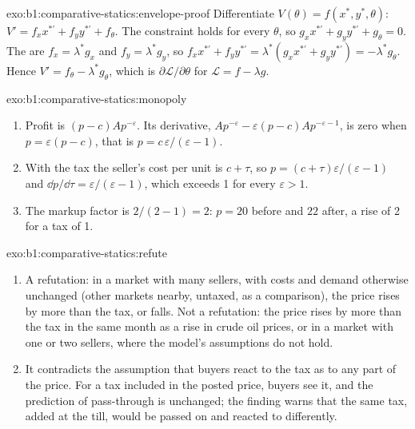 \begin{solution}{exo:b1:comparative-statics:envelope-proof}
Differentiate $V(\theta) = f(x^*, y^*, \theta)$:
$V' = f_x x^{*\prime} + f_y y^{*\prime} + f_\theta$. The constraint holds for
every $\theta$, so $g_x x^{*\prime} + g_y y^{*\prime} + g_\theta = 0$. The  are $f_x = \lambda^* g_x$ and $f_y = \lambda^* g_y$, so
$f_x x^{*\prime} + f_y y^{*\prime} = \lambda^*(g_x x^{*\prime} + g_y y^{*\prime})
= -\lambda^* g_\theta$. Hence $V' = f_\theta - \lambda^* g_\theta$, which is
$\partial\mathcal L/\partial\theta$ for $\mathcal L = f - \lambda g$.
\end{solution}

\begin{solution}{exo:b1:comparative-statics:monopoly}
\begin{enumerate}
  \item Profit is $(p - c)Ap^{-\varepsilon}$. Its derivative,
    $Ap^{-\varepsilon} - \varepsilon(p - c)Ap^{-\varepsilon - 1}$, is zero when
    $p = \varepsilon(p - c)$, that is $p = c\,\varepsilon/(\varepsilon - 1)$.
  \item With the tax the seller's cost per unit is $c + \tau$, so
    $p = (c + \tau)\varepsilon/(\varepsilon - 1)$ and
    $\dd p/\dd\tau = \varepsilon/(\varepsilon - 1)$, which exceeds 1 for every
    $\varepsilon > 1$.
  \item The markup factor is $2/(2 - 1) = 2$: $p = 20$ before and $22$ after, a
    rise of 2 for a tax of 1.
\end{enumerate}
\end{solution}

\begin{solution}{exo:b1:comparative-statics:refute}
\begin{enumerate}
  \item A refutation: in a market with many sellers, with costs and demand
    otherwise unchanged (other markets nearby, untaxed, as a comparison),
    the price rises by more than the tax, or falls. Not a refutation: the
    price rises by more than the tax in the same month as a rise in crude oil
    prices, or in a market with one or two sellers, where the model's
    assumptions do not hold.
  \item It contradicts the assumption that buyers react to the tax as to any
    part of the price. For a tax included in the posted price, buyers see it,
    and the prediction of pass-through is unchanged; the finding warns that
    the same tax, added at the till, would be passed on and reacted to
    differently.
\end{enumerate}
\end{solution}

